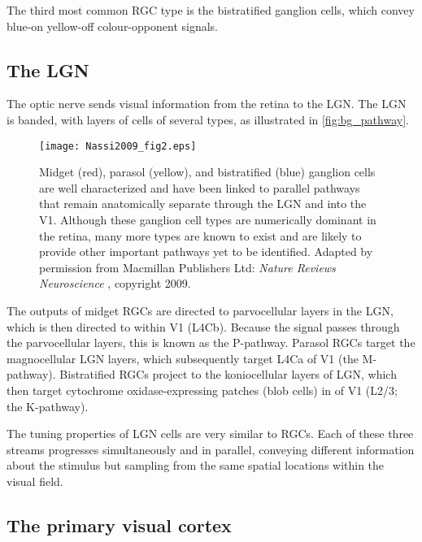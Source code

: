 The third most common \ac{RGC} type is the bistratified ganglion cells, which convey blue-on yellow-off colour-opponent signals.



\subsection{The \acl{LGN}}

The optic nerve sends visual information from the retina to the \acf{LGN}.
The \ac{LGN} is banded, with layers of cells of several types, as illustrated in \autoref{fig:bg_pathway}.

\begin{figure}[htbp]
\centerline{
\texttt{[image: Nassi2009\_fig2.eps]}
}
\caption{
Midget (red), parasol (yellow), and bistratified (blue) ganglion cells are well characterized and have been linked to parallel pathways that remain anatomically separate through the \ac{LGN} and into the \ac{V1}.
Although these ganglion cell types are numerically dominant in the retina, many more types are known to exist and are likely to provide other important pathways yet to be identified.
Adapted by permission from Macmillan Publishers Ltd: \textit{Nature Reviews Neuroscience} \citep{Nassi2009}, copyright 2009.
}
\label{fig:bg_pathway}
\end{figure}

The outputs of midget \acp{RGC} are directed to parvocellular layers in the \ac{LGN}, which is then directed to  within \ac{V1} (\acs{L4Cb}).
Because the signal passes through the parvocellular layers, this is known as the P-pathway.
Parasol \acp{RGC} target the magnocellular \ac{LGN} layers, which subsequently target \acs{L4Ca} of \ac{V1} (the M-pathway).
Bistratified \acp{RGC} project to the koniocellular layers of \ac{LGN}, which then target cytochrome oxidase-expressing patches (blob cells) in  of \ac{V1} (\acs{L2/3}; the K-pathway).

The tuning properties of \ac{LGN} cells are very similar to \acp{RGC}.
Each of these three streams progresses simultaneously and in parallel, conveying different information about the stimulus but sampling from the same spatial locations within the visual field.


\subsection{The primary visual cortex}
\label{sec:bg_v1}

